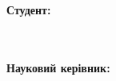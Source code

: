 \begin{titlepage}
    \begin{center}
        \begin{spacing}{1.5}
            \textbf{\Large{\ReportPreamble}} \\
            \vspace{1cm}\textbf{\large{\ReportName}} \\ 
        \end{spacing}
    \end{center}

    \vspace{\fill}

    \newlength{\maxname}
    \settowidth{\maxname}{\small{\TheLongestLabel}}

    \hfill\parbox{\maxname}{
        \begin{spacing}{1.1}
            \small{\textbf{Студент:}} \\ 
            \small{\AuthorInfo} \\
            \small{\AuthorName} \\
        \end{spacing}
    }

    \hfill\parbox{\maxname}{
        \begin{spacing}{1.1}
            \small{\textbf{Науковий керівник:}} \\ 
            \small{\SupervisorInfo} \\
            \small{\SupervisorName} \\
        \end{spacing}
    }

    \vspace{1cm}
    
    \begin{center}
        \small{\the\year}
    \end{center}
    
\end{titlepage}